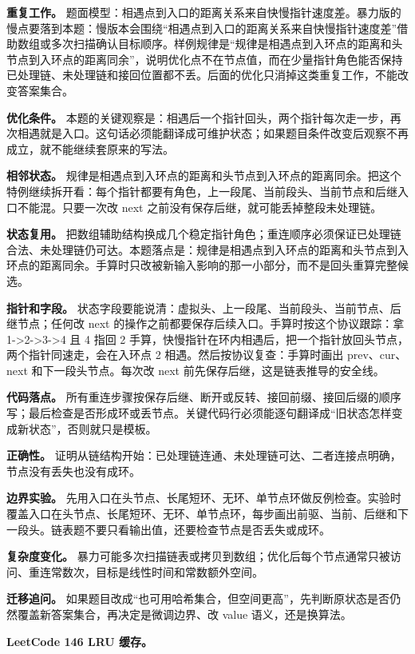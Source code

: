 \textbf{重复工作。} 题面模型：相遇点到入口的距离关系来自快慢指针速度差。暴力版的慢点要落到本题：慢版本会围绕“相遇点到入口的距离关系来自快慢指针速度差”借助数组或多次扫描确认目标顺序。样例规律是“规律是相遇点到入环点的距离和头节点到入环点的距离同余”，说明优化点不在节点值，而在少量指针角色能否保持已处理链、未处理链和接回位置都不丢。后面的优化只消掉这类重复工作，不能改变答案集合。

\textbf{优化条件。} 本题的关键观察是：相遇后一个指针回头，两个指针每次走一步，再次相遇就是入口。这句话必须能翻译成可维护状态；如果题目条件改变后观察不再成立，就不能继续套原来的写法。

\textbf{相邻状态。} 规律是相遇点到入环点的距离和头节点到入环点的距离同余。把这个特例继续拆开看：每个指针都要有角色，上一段尾、当前段头、当前节点和后继入口不能混。只要一次改 next 之前没有保存后继，就可能丢掉整段未处理链。

\textbf{状态复用。} 把数组辅助结构换成几个稳定指针角色；重连顺序必须保证已处理链合法、未处理链仍可达。本题落点是：规律是相遇点到入环点的距离和头节点到入环点的距离同余。手算时只改被新输入影响的那一小部分，而不是回头重算完整候选。

\textbf{指针和字段。} 状态字段要能说清：虚拟头、上一段尾、当前段头、当前节点、后继节点；任何改 next 的操作之前都要保存后续入口。手算时按这个协议跟踪：拿 1->2->3->4 且 4 指回 2 手算，快慢指针在环内相遇后，把一个指针放回头节点，两个指针同速走，会在入环点 2 相遇。然后按协议复查：手算时画出 prev、cur、next 和下一段头节点。每次改 next 前先保存后继，这是链表推导的安全线。

\textbf{代码落点。} 所有重连步骤按保存后继、断开或反转、接回前缀、接回后缀的顺序写；最后检查是否形成环或丢节点。关键代码行必须能逐句翻译成“旧状态怎样变成新状态”，否则就只是模板。

\textbf{正确性。} 证明从链结构开始：已处理链连通、未处理链可达、二者连接点明确，节点没有丢失也没有成环。

\textbf{边界实验。} 先用入口在头节点、长尾短环、无环、单节点环做反例检查。实验时覆盖入口在头节点、长尾短环、无环、单节点环，每步画出前驱、当前、后继和下一段头。链表题不要只看输出值，还要检查节点是否丢失或成环。

\textbf{复杂度变化。} 暴力可能多次扫描链表或拷贝到数组；优化后每个节点通常只被访问、重连常数次，目标是线性时间和常数额外空间。

\textbf{迁移追问。} 如果题目改成“也可用哈希集合，但空间更高”，先判断原状态是否仍然覆盖新答案集合，再决定是微调边界、改 value 语义，还是换算法。

\noindent\textbf{LeetCode 146 LRU 缓存。}

